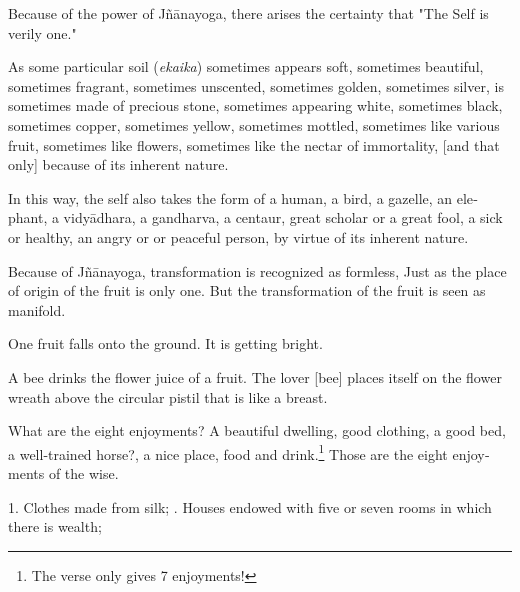 \begin{otherlanguage}{english}
\begin{tlate}
\end{tlate}
\begin{tlate}
Because of the power of Jñānayoga, there arises the certainty that "The Self is verily one."
\end{tlate}
\begin{tlate}
As some particular soil (\textit{ekaika}) sometimes appears soft, sometimes beautiful, sometimes fragrant, sometimes unscented, sometimes golden, sometimes silver, is sometimes made of precious stone, sometimes appearing white, sometimes black, sometimes copper, sometimes yellow, sometimes mottled, sometimes like various fruit, sometimes like flowers, sometimes like the nectar of immortality, [and that only] because of its inherent nature.  
\end{tlate}
\begin{tlate}
In this way, the self also takes the form of a human, a bird, a gazelle, an elephant, a vidyādhara, a gandharva, a centaur, great scholar or a great fool, a sick or healthy, an angry or or peaceful person, by virtue of its inherent nature. 
\end{tlate}
\begin{tlate}
Because of Jñānayoga, transformation is recognized as formless, Just as the place of origin of the fruit is only one. But the transformation of the fruit is seen as manifold. 
\end{tlate}
\begin{tlate}
One fruit falls onto the ground. It is getting bright. 
\end{tlate}
\begin{tlate}
A bee drinks the flower juice of a fruit. The lover [bee] places itself on the flower wreath above the circular pistil that is like a breast.
\end{tlate}
\begin{tlate}
  What are the eight enjoyments?  \hfill \break
  A beautiful dwelling, good clothing, a good bed, a well-trained horse?, a nice place, food and drink.\footnote{The verse only gives 7 enjoyments!} Those are the eight enjoyments of the wise.
\end{tlate}
\begin{tlate}
  1. Clothes made from silk; \hfill {}. Houses endowed with five or seven rooms in which there is wealth; \hfill \break

\end{tlate}
\end{otherlanguage}
